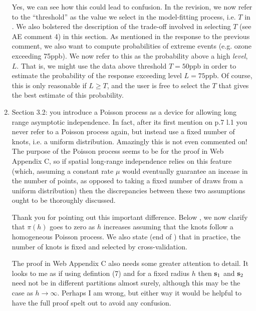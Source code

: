 \documentclass[11pt]{article}
\begin{document}
\begin{enumerate}[1.]
  \begin{response}
    Yes, we can see how this could lead to confusion.
    In the revision, we now refer to the ``threshold'' as the value we select in the model-fitting process, i.e. $T$ in .
    We also bolstered the description of the trade-off involved in selecting $T$ (see AE comment 4) in this section.
    As mentioned in the response to the previous comment, we also want to compute probabilities of extreme events (e.g. ozone exceeding 75ppb).
    We now refer to this as the probability above a high \emph{level}, $L$.
    That is, we might use the data above threshold $T = 50$ppb in order to estimate the probability of the response exceeding level $L = 75$ppb.
    Of course, this is only reasonable if $L \ge T$, and the user is free to select the $T$ that gives the best estimate of this probability.
  \end{response}

  \item Section 3.2: you introduce a Poisson process as a device for allowing long range asymptotic independence. In fact, after its first mention on p.7 l.1 you never refer to a Poisson process again, but instead use a fixed number of knots, i.e. a uniform distribution. Amazingly this is not even commented on! The purpose of the Poisson process seems to be for the proof in Web Appendix C, so if spatial long-range independence relies on this feature (which, assuming a constant rate $\mu$ would eventually guarantee an incease in the number of points, as opposed to taking a fixed number of draws from a uniform distribution) then the discrepancies between these two assumptions ought to be thoroughly discussed. \\

  \begin{response}
    Thank you for pointing out this important difference.
    Below , we now clarify that $\pi(h)$ goes to zero as $h$ increases assuming that the knots follow a homogeneous Poisson process.
    We also state (end of ) that in practice, the number of knots is fixed and selected by cross-validation.
  \end{response}

  The proof in Web Appendix C also needs some greater attention to detail. It looks to me as if using defintion (7) and for a fixed radius $h$ then $\mbox{\bf s}_1$ and $\mbox{\bf s}_2$ need not be in different partitions almost surely, although this may be the case as $h \rightarrow \infty$. Perhaps I am wrong, but either way it would be helpful to have the full proof spelt out to avoid any confusion. \\


\end{enumerate}
\end{document}

